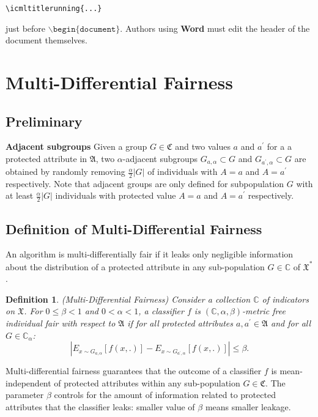 \documentclass{article}
\newtheorem{defn}[thm]{Definition}
\begin{document}
\verb|\icmltitlerunning{...}|

just before $\mathtt{\backslash begin\{document\}}$.
Authors using \textbf{Word} must edit the header of the document themselves.

\section{Multi-Differential Fairness}
\subsection{Preliminary}
\textbf{Adjacent subgroups} Given a group $G\in\mathfrak{C}$ and two values $a$ and $a^{'}$ for a a protected attribute in $\mathfrak{A}$, two $\alpha$-adjacent subgroups  $G_{a, \alpha}\subset G$ and  $G_{a^{'}, \alpha} \subset G$ are obtained by randomly removing $\frac{\alpha}{2}|G|$ of individuals with $A=a$ and $A=a^{'}$ respectively. Note that adjacent groups are only defined for subpopulation $G$ with at least  $\frac{\alpha}{2}|G|$ individuals with protected value $A=a$ and $A=a^{'}$ respectively. 


\subsection{Definition of Multi-Differential Fairness}
An algorithm is multi-differentially fair if it leaks only negligible information about the distribution of a protected attribute in any sub-population $G \in \mathbb{C}$ of $\mathfrak{X}^{*}$ . 

\begin{defn}(Multi-Differential Fairness)
\label{def: mdf}
Consider a collection $\mathbb{C}$ of indicators on $\mathfrak{X}$. For $0\leq \beta <1$ and $0<\alpha<1$, a classifier $f$ is $(\mathbb{C}, \alpha, \beta)$-metric free individual fair with respect to $\mathfrak{A}$ if for all protected attributes $a, a^{'}\in \mathfrak{A}$ and for all $G\in \mathbb{C}_{\alpha}$:
\begin{equation}  \left |E_{x\sim G_{a, \alpha}}[f(x, .)] - E_{x\sim G_{a^{'}, \alpha}}[f(x, .)]\right| \leq \beta.\end{equation}
\end{defn}

Multi-differential fairness guarantees that the outcome of a classifier $f$ is mean-independent of protected attributes within any sub-population $G\in \mathfrak{C}$. The parameter $\beta$ controls for the amount of information related to protected attributes that the classifier leaks: smaller value of $\beta$ means smaller leakage. 
\end{document}
